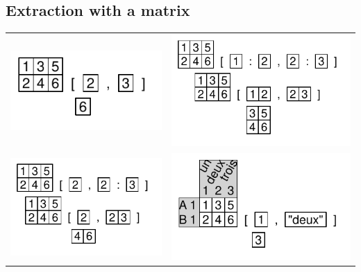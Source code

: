 \documentclass[pdflatex]{article}
\begin{document}
\subsection{Extraction with a matrix}

\begin{tabular}{cc}
\includegraphics{matrix_extraction} & \includegraphics{matrix_extraction3}\\
\includegraphics{matrix_extraction2} & \includegraphics{matrix_extraction4}\\
\end{tabular}
\end{document}
